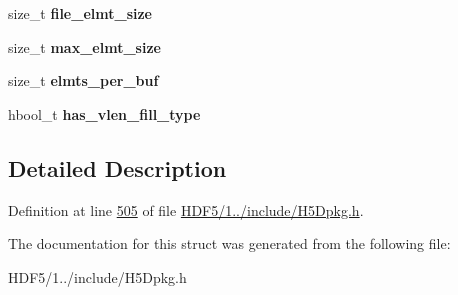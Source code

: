 \begin{DoxyCompactItemize}
\mbox{\label{struct_h5_d__fill__buf__info__t_a04e67747e02fb6411998dea9eaf6204a}} 
size\+\_\+t {\bfseries file\+\_\+elmt\+\_\+size}
\item 
\mbox{\label{struct_h5_d__fill__buf__info__t_a3c01986f85990d8beebadfb91f2a7b55}} 
size\+\_\+t {\bfseries max\+\_\+elmt\+\_\+size}
\item 
\mbox{\label{struct_h5_d__fill__buf__info__t_a357ebc913e1ca93460b3ce4e932aa666}} 
size\+\_\+t {\bfseries elmts\+\_\+per\+\_\+buf}
\item 
\mbox{\label{struct_h5_d__fill__buf__info__t_a49e136622fbe284c4159867ff9d8fa03}} 
hbool\+\_\+t {\bfseries has\+\_\+vlen\+\_\+fill\+\_\+type}
\end{DoxyCompactItemize}


\subsection{Detailed Description}


Definition at line \hyperlink{_h_d_f5_21_810_81_2include_2_h5_dpkg_8h_source_l00505}{505} of file \hyperlink{_h_d_f5_21_810_81_2include_2_h5_dpkg_8h_source}{H\+D\+F5/1../include/\+H5\+Dpkg.\+h}.



The documentation for this struct was generated from the following file\+:\begin{DoxyCompactItemize}
\item 
H\+D\+F5/1../include/\+H5\+Dpkg.\+h\end{DoxyCompactItemize}
